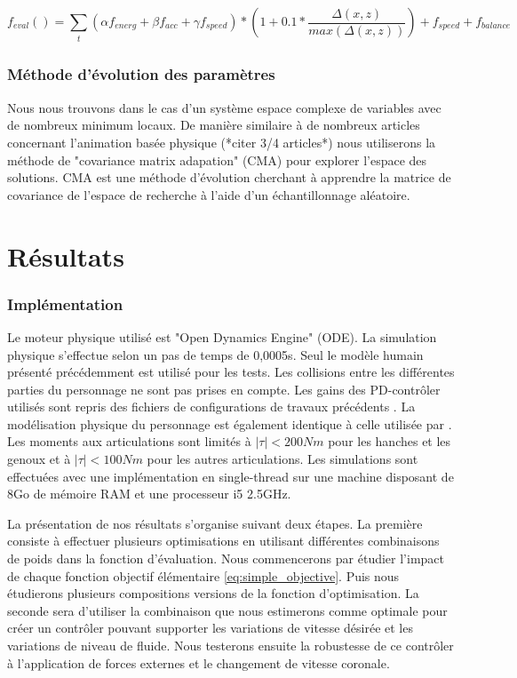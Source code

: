\documentclass[runningheads,a4paper]{llncs}
\begin{document}
\begin{equation}
f_{eval}() =\sum_{\substack{t}} (\alpha f_{energ} + \beta f_{acc} + \gamma f_{speed})*(1+0.1*\frac{\Delta(x,z)}{max(\Delta(x,z))}) + f_{speed} + f_{balance}
\label{eq:complete_eval}
\end{equation}



%
\subsubsection{Méthode d'évolution des paramètres}
Nous nous trouvons dans le cas d'un système espace complexe de variables avec de nombreux minimum locaux. De manière similaire à de nombreux articles concernant l'animation basée physique (*citer 3/4 articles*) nous utiliserons la méthode de "covariance matrix adapation" (CMA) \cite{hansen2006cma} pour explorer l'espace des solutions. CMA est une méthode d'évolution cherchant à apprendre la matrice de covariance de l'espace de recherche à l'aide d'un échantillonnage aléatoire.




%
\section{Résultats}
%
\subsubsection{Implémentation}
Le moteur physique utilisé est "Open Dynamics Engine" (ODE). La simulation physique s'effectue selon un pas de temps de 0,0005s. Seul le modèle humain présenté précédemment est utilisé pour les tests. Les collisions entre les différentes parties du personnage ne sont pas prises en compte. Les gains des PD-contrôler utilisés sont repris des fichiers de configurations de travaux précédents \cite{coros2009robust}. La modélisation physique du personnage est également identique à celle utilisée par \cite{coros2009robust}. Les moments aux articulations sont limités à $|\tau|<200Nm$ pour les hanches et les genoux et à $|\tau|<100Nm$ pour les autres articulations.
Les simulations sont effectuées avec une implémentation en single-thread sur une machine disposant de 8Go de mémoire RAM et une processeur i5 2.5GHz.

La présentation de nos résultats s'organise suivant deux étapes. La première consiste à effectuer plusieurs optimisations en utilisant différentes combinaisons de poids dans la fonction d'évaluation. Nous commencerons par étudier l'impact de chaque fonction objectif élémentaire \ref{eq:simple_objective}. Puis nous étudierons plusieurs compositions versions de la fonction d'optimisation. La seconde sera d'utiliser la combinaison que nous estimerons comme optimale pour créer un contrôler pouvant supporter les variations de vitesse désirée et les variations de niveau de fluide. Nous testerons ensuite la robustesse de ce contrôler à l'application de forces externes et le changement de vitesse coronale.
\end{document}
